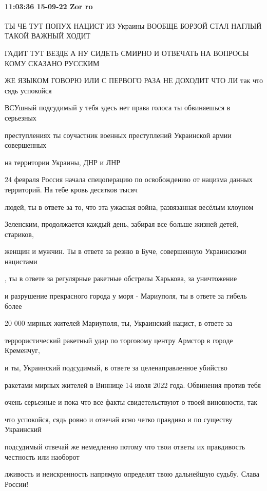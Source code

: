  
 
 
 
 

\paragraph{11:03:36 15-09-22 Zor ro}

ТЫ ЧЕ ТУТ ПОПУХ НАЦИСТ ИЗ Украины ВООБЩЕ БОРЗОЙ СТАЛ НАГЛЫЙ ТАКОЙ ВАЖНЫЙ ХОДИТ

ГАДИТ ТУТ ВЕЗДЕ А НУ СИДЕТЬ СМИРНО И ОТВЕЧАТЬ НА ВОПРОСЫ КОМУ СКАЗАНО РУССКИМ

ЖЕ ЯЗЫКОМ ГОВОРЮ ИЛИ С ПЕРВОГО РАЗА НЕ ДОХОДИТ ЧТО ЛИ так что сядь успокойся

ВСУшный подсудимый у тебя здесь нет права голоса ты обвиняешься в серьезных

преступлениях ты соучастник военных преступлений Украинской армии совершенных

на территории Украины, ДНР и ЛНР

24 февраля Россия начала спецоперацию по освобождению от нацизма данных территорий. На тебе кровь десятков тысяч

людей, ты в ответе за то, что эта ужасная война, развязанная весёлым клоуном

Зеленским, продолжается каждый день, забирая все больше жизней детей, стариков,

женщин и мужчин. Ты в ответе за резню в Буче, совершенную Украинскими нацистами

, ты в ответе за регулярные ракетные обстрелы Харькова, за уничтожение

и разрушение прекрасного города у моря - Мариуполя, ты в ответе за гибель более

20 000 мирных жителей Мариуполя, ты, Украинский нацист, в ответе за

террористический ракетный удар по торговому центру Армстор в городе Кременчуг,

и ты, Украинский подсудимый, в ответе за целенаправленное убийство

ракетами мирных жителей в Виннице 14 июля 2022 года. Обвинения против тебя

очень серьезные и пока что все факты свидетельствуют о твоей виновности, так

что успокойся, сядь ровно и отвечай ясно четко правдиво и по существу Украинский

подсудимый отвечай же немедленно потому что твои ответы их правдивость честность или наоборот

лживость и неискренность напрямую определят твою дальнейшую судьбу. Слава России!
